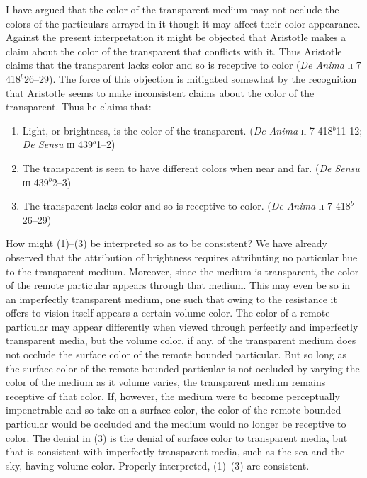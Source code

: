 I have argued that the color of the transparent medium may not occlude the colors of the particulars arrayed in it though it may affect their color appearance. Against the present interpretation it might be objected that Aristotle makes a claim about the color of the transparent that conflicts with it. Thus Aristotle claims that the transparent lacks color and so is receptive to color (\emph{De Anima} \textsc{ii} 7 418\( ^{b} \)26--29). The force of this objection is mitigated somewhat by the recognition that Aristotle seems to make inconsistent claims about the color of the transparent. Thus he claims that:
\begin{enumerate}[(1)]
	\item Light, or brightness, is the color of the transparent. (\emph{De Anima} \textsc{ii} 7 418\( ^{b} \)11-12; \emph{De Sensu} \textsc{iii} 439\( ^{b} \)1--2)
	\item The transparent is seen to have different colors when near and far. (\emph{De Sensu} \textsc{iii} 439\( ^{b} \)2--3)
	\item The transparent lacks color and so is receptive to color. (\emph{De Anima} \textsc{ii} 7 418\( ^{b} \)26--29)
\end{enumerate}
How might (1)--(3) be interpreted so as to be consistent? We have already observed that the attribution of brightness requires attributing no particular hue to the transparent medium. Moreover, since the medium is transparent, the color of the remote particular appears through that medium. This may even be so in an imperfectly transparent medium, one such that owing to the resistance it offers to vision itself appears a certain volume color. The color of a remote particular may appear differently when viewed through perfectly and imperfectly transparent media, but the volume color, if any, of the transparent medium does not occlude the surface color of the remote bounded particular. But so long as the surface color of the remote bounded particular is not occluded by varying the color of the medium as it volume varies, the transparent medium remains receptive of that color. If, however, the medium were to become perceptually impenetrable and so take on a surface color, the color of the remote bounded particular would be occluded and the medium would no longer be receptive to color. The denial in (3) is the denial of surface color to transparent media, but that is consistent with imperfectly transparent media, such as the sea and the sky, having volume color. Properly interpreted, (1)--(3) are consistent.

